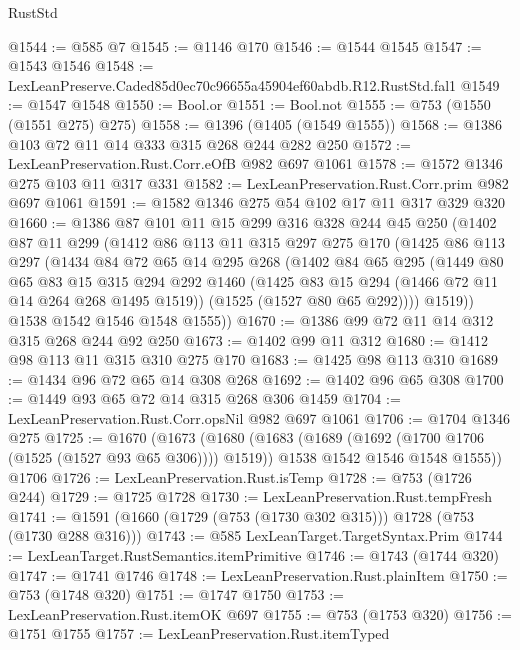 \begin{lexlean}{RustStd}
\begin{coremodule}
@1544 := @585 @7
@1545 := @1146 @170
@1546 := @1544 @1545
@1547 := @1543 @1546
@1548 := LexLeanPreserve.Caded85d0ec70c96655a45904ef60abdb.R12.RustStd.fal1
@1549 := @1547 @1548
@1550 := Bool.or
@1551 := Bool.not
@1555 := @753 (@1550 (@1551 @275) @275)
@1558 := @1396 (@1405 (@1549 @1555))
@1568 := @1386 @103 @72 @11 @14 @333 @315 @268 @244 @282 @250
@1572 := LexLeanPreservation.Rust.Corr.eOfB @982 @697 @1061
@1578 := @1572 @1346 @275 @103 @11 @317 @331
@1582 := LexLeanPreservation.Rust.Corr.prim @982 @697 @1061
@1591 := @1582 @1346 @275 @54 @102 @17 @11 @317 @329 @320
@1660 := @1386
    @87
    @101
    @11
    @15
    @299
    @316
    @328
    @244
    @45
    @250
    (@1402
      @87
      @11
      @299
      (@1412
        @86
        @113
        @11
        @315
        @297
        @275
        @170
        (@1425
          @86
          @113
          @297
          (@1434
            @84
            @72
            @65
            @14
            @295
            @268
            (@1402
              @84
              @65
              @295
              (@1449
                @80
                @65
                @83
                @15
                @315
                @294
                @292
                @1460
                (@1425 @83 @15 @294 (@1466 @72 @11 @14 @264 @268 @1495 @1519))
                (@1525 (@1527 @80 @65 @292))))
            @1519))
        @1538
        @1542
        @1546
        @1548
        @1555))
@1670 := @1386 @99 @72 @11 @14 @312 @315 @268 @244 @92 @250
@1673 := @1402 @99 @11 @312
@1680 := @1412 @98 @113 @11 @315 @310 @275 @170
@1683 := @1425 @98 @113 @310
@1689 := @1434 @96 @72 @65 @14 @308 @268
@1692 := @1402 @96 @65 @308
@1700 := @1449 @93 @65 @72 @14 @315 @268 @306 @1459
@1704 := LexLeanPreservation.Rust.Corr.opsNil @982 @697 @1061
@1706 := @1704 @1346 @275
@1725 := @1670
    (@1673
      (@1680
        (@1683 (@1689 (@1692 (@1700 @1706 (@1525 (@1527 @93 @65 @306)))) @1519))
        @1538
        @1542
        @1546
        @1548
        @1555))
    @1706
@1726 := LexLeanPreservation.Rust.isTemp
@1728 := @753 (@1726 @244)
@1729 := @1725 @1728
@1730 := LexLeanPreservation.Rust.tempFresh
@1741 := @1591 (@1660 (@1729 (@753 (@1730 @302 @315))) @1728 (@753 (@1730 @288 @316)))
@1743 := @585 LexLeanTarget.TargetSyntax.Prim
@1744 := LexLeanTarget.RustSemantics.itemPrimitive
@1746 := @1743 (@1744 @320)
@1747 := @1741 @1746
@1748 := LexLeanPreservation.Rust.plainItem
@1750 := @753 (@1748 @320)
@1751 := @1747 @1750
@1753 := LexLeanPreservation.Rust.itemOK @697
@1755 := @753 (@1753 @320)
@1756 := @1751 @1755
@1757 := LexLeanPreservation.Rust.itemTyped

\end{coremodule}
\end{lexlean}
